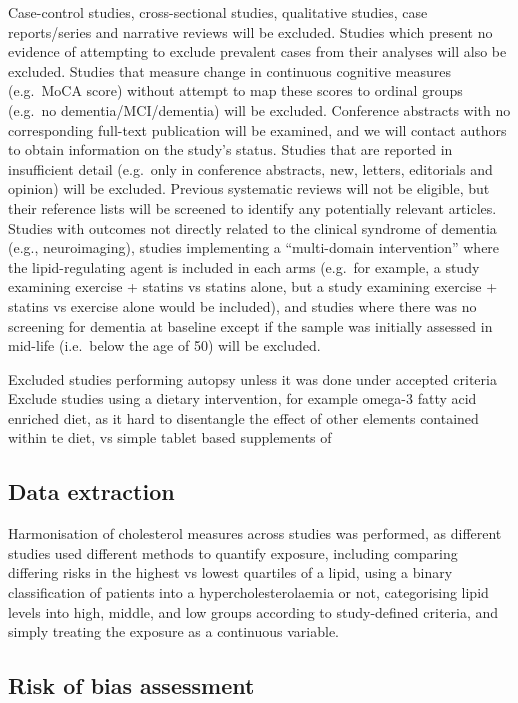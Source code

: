 \documentclass[a4paper, nobind]{templates/ociamthesis}
\begin{document}
Case-control studies, cross-sectional studies, qualitative studies, case reports/series and narrative reviews will be excluded. Studies which present no evidence of attempting to exclude prevalent cases from their analyses will also be excluded. Studies that measure change in continuous cognitive measures (e.g.~MoCA score) without attempt to map these scores to ordinal groups (e.g.~no dementia/MCI/dementia) will be excluded. Conference abstracts with no corresponding full-text publication will be examined, and we will contact authors to obtain information on the study's status. Studies that are reported in insufficient detail (e.g.~only in conference abstracts, new, letters, editorials and opinion) will be excluded. Previous systematic reviews will not be eligible, but their reference lists will be screened to identify any potentially relevant articles. Studies with outcomes not directly related to the clinical syndrome of dementia (e.g., neuroimaging), studies implementing a ``multi-domain intervention'' where the lipid-regulating agent is included in each arms (e.g.~for example, a study examining exercise + statins vs statins alone, but a study examining exercise + statins vs exercise alone would be included), and studies where there was no screening for dementia at baseline except if the sample was initially assessed in mid-life (i.e.~below the age of 50) will be excluded.

Excluded studies performing autopsy unless it was done under accepted criteria
Exclude studies using a dietary intervention, for example omega-3 fatty acid enriched diet, as it hard to disentangle the effect of other elements contained within te diet, vs simple tablet based supplements of

\hypertarget{data-extraction}{%
\subsection{Data extraction}\label{data-extraction}}

Harmonisation of cholesterol measures across studies was performed, as different studies used different methods to quantify exposure, including comparing differing risks in the highest vs lowest quartiles of a lipid, using a binary classification of patients into a hypercholesterolaemia or not, categorising lipid levels into high, middle, and low groups according to study-defined criteria, and simply treating the exposure as a continuous variable.

\hypertarget{risk-of-bias-assessment}{%
\subsection{Risk of bias assessment}\label{risk-of-bias-assessment}}
\end{document}
